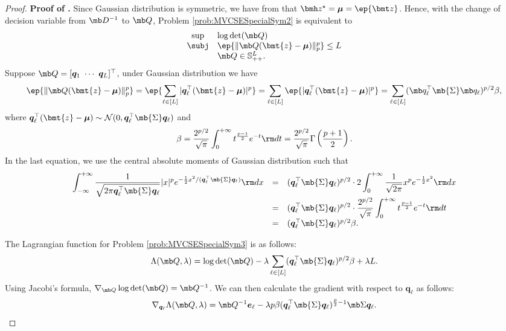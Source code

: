 \documentclass[opre, blindrev]{informs4}
\newcommand{\1}[1]{\mathds{1}{\left(#1\right)}}
\begin{document}
\begin{appendices}
\begin{proof}{\bf Proof of .}
Since Gaussian distribution is symmetric, we have from  that $\bmh z^\star = \bm \mu = \ep{\bmt z}$. Hence, with the change of decision variable from $\mb D^{-1}$ to $\mb Q$, Problem \eqref{prob:MVCSESpecialSym2} is equivalent to
\begin{equation}
\label{prob:MVCSESpecialSym3}
\begin{array}{cll}
\sup & \log\det({\mb Q}) \\
\subj & \ep{\|\mb Q ( \bmt{z} - \bm{\mu})\|_p^p} \leq L \\
& \mb Q \in \mathbb{S}^L_{++}.
\end{array}  
\end{equation}
Suppose $\mb Q = [ \bm q_1 ~\cdots~ \bm q_L]^\top$, under Gaussian distribution we have
\[
\ep{\|\mb Q (\bmt{z} - \bm \mu)\|_p^p} = \ep{\sum_{\ell \in [L]} | \bm q_{\ell}^\top (\bmt{z} - \bm \mu)|^p} = \sum_{\ell \in [L]} \ep{|\bm q_\ell^\top (\bmt{z} - \bm \mu)|^p}  = \sum_{\ell \in [L]} (\mb q_\ell^\top \mb{\Sigma} \mb q_\ell)^{p/2} \beta,
\]
where $\bm q_\ell^\top ( \bmt{z} - \bm \mu ) \sim \mathcal{N}(0, \bm q_\ell^\top \mb{\Sigma} \bm q_\ell)$ and
$$
\beta = \frac{2^{p/2}}{\sqrt{\pi}} \int_{0}^{+\infty} t^{\frac{p-1}{2}} e^{- t} {\rm d}t = \frac{2^{p/2}}{\sqrt{\pi}} \Gamma \left( \frac{p+1}{2} \right).
$$
In the last equation, we use the central absolute moments of Gaussian distribution such that
\[
\begin{array}{rcl}
\displaystyle \int_{-\infty}^{+\infty} \frac{1}{\sqrt{2 \pi \bm q_\ell^\top \mb{\Sigma} \bm q_\ell} } |x|^{p} e^{- \frac{1}{2} x^2 / (\bm q_\ell^\top \mb{\Sigma} \bm q_\ell)} {\rm d}x & = & \displaystyle (\bm q_\ell^\top \mb{\Sigma} \bm q_\ell)^{p/2} \cdot 2 \int_{0}^{+\infty} \frac{1}{\sqrt{2 \pi}} x^p e^{- \frac{1}{2} x^2} {\rm d}x \\
& = & \displaystyle (\bm q_\ell^\top \mb{\Sigma} \bm q_\ell)^{p/2} \cdot \frac{2^{p/2}}{\sqrt{\pi}} \int_{0}^{+\infty} t^{\frac{p-1}{2}} e^{- t} {\rm d}t \\
& = &  (\bm q_\ell^\top \mb{\Sigma} \bm q_\ell)^{p/2} \beta.
\end{array}
\]

The Lagrangian function for Problem \eqref{prob:MVCSESpecialSym3} is as follows:
$$
\Lambda (\mb Q, \lambda) = \log\det(\mb Q)  -\lambda \sum_{\ell \in [L]} ( \bm q_\ell^\top \mb{\Sigma} \bm q_\ell)^{p/2} \beta + \lambda L.
$$
Using Jacobi's formula, $\nabla_{\mb Q} \log\det(\mb Q) = \mb Q^{-1}$. We can then calculate the gradient with respect to $\bm q_\ell$ as follows:
\begin{equation}
\label{chap8:eq:MinimumVolumeSpecialGaussian_Grad}
\nabla_{\bm q_\ell} \Lambda (\mb Q, \lambda) = \mb Q^{-1} \bm e_{\ell}  - \lambda p \beta ( \bm q_\ell^\top \mb{\Sigma} \bm q_\ell)^{\frac{p}{2} - 1} \mb \Sigma \bm q_\ell.    
\end{equation}


\end{proof}
\end{appendices}
\end{document}
